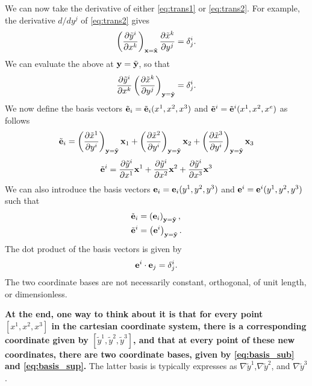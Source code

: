 \documentclass[11pt]{article}
\newcommand{\xtilde}{\tilde{x}}
\newcommand{\ytilde}{\tilde{y}}
\begin{document}
We can now take the derivative of either \cref{eq:trans1} or \cref{eq:trans2}. For example, the derivative $d/dy^j$ of \cref{eq:trans2} gives
\begin{equation}
    \left( \frac{\partial \ytilde^i}{\partial x^k} \right)_{\xvec = \tilde{\xvec}} \frac{\partial \xtilde^k}{\partial y^j} = \delta^i_j.
\end{equation}
We can evaluate the above at $\mathbf{y} = \tilde{\mathbf{y}}$, so that
\begin{equation}
     \frac{\partial \ytilde^i}{\partial x^k} \left( \frac{\partial \xtilde^k}{\partial y^j} \right)_{\yvec = \tilde{\yvec}} = \delta^i_j.
\end{equation}
We now define the basis vectors $\tilde{\mathbf{e}}_i = \tilde{\mathbf{e}}_i(x^1, x^2, x^3)$ and $\tilde{\mathbf{e}}^i = \tilde{\mathbf{e}}^i(x^1, x^2, x^e)$ as follows
\begin{equation}
\label{eq:basis_sub}
    \tilde{\evec}_i = \left( \frac{ \partial \xtilde^1}{\partial y^i} \right)_{\yvec = \tilde{\yvec}} \xvec_1 + \left( \frac{ \partial \xtilde^2}{\partial y^i} \right)_{\yvec = \tilde{\yvec}} \xvec_2 + \left( \frac{ \partial \xtilde^3}{\partial y^i} \right)_{\yvec = \tilde{\yvec}} \xvec_3
\end{equation}
\begin{equation}
\label{eq:basis_sup}
    \tilde{\evec}^i = \frac{ \partial \ytilde^i}{\partial x^1} \xvec^1 + \frac{ \partial \ytilde^i}{\partial x^2} \xvec^2 + \frac{ \partial \ytilde^i}{\partial x^3} \xvec^3
\end{equation}
We can also introduce the basis vectors $\mathbf{e}_i = \mathbf{e}_i(y^1, y^2, y^3)$ and $\mathbf{e}^i = \mathbf{e}^i(y^1, y^2, y^3)$ such that
\begin{align}
    \tilde{\mathbf{e}}_i &= \left( \mathbf{e}_i \right)_{\mathbf{y} = \tilde{\mathbf{y}}}, \\
    \tilde{\mathbf{e}}^i &= \left( \mathbf{e}^i \right)_{\mathbf{y} = \tilde{\mathbf{y}}}.
\end{align}
The dot product of the basis vectors is given by
\begin{equation}
\label{eq:basis_orthogonality}
    \mathbf{e}^i \cdot \mathbf{e}_j = \delta^i_j.
\end{equation}
The two coordinate bases are not necessarily constant, orthogonal, of unit length, or dimensionless.

\textbf{At the end, one way to think about it is that for every point $[x^1,x^2,x^3]$ in the cartesian coordinate system, there is a corresponding coordinate given by $[\ytilde^1,\ytilde^2,\ytilde^3]$, and that at every point of these new coordinates, there are two coordinate bases, given by \cref{eq:basis_sub} and \cref{eq:basis_sup}.} The latter basis is typically expresses as $\nabla \ytilde^1$,$\nabla \ytilde^2$, and $\nabla \ytilde^3$.
\end{document}
